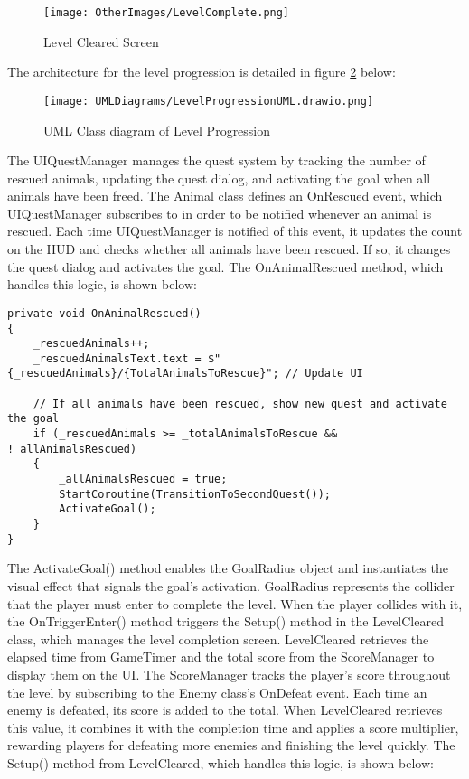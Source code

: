 \documentclass[]{final_report}
\begin{document}
\begin{figure}[H]
    \centering
    \texttt{[image: OtherImages/LevelComplete.png]}
    \caption{Level Cleared Screen}
    \label{fig:label_levelcleared}
\end{figure}

The architecture for the level progression is detailed in figure \ref{fig:label_levelprogression} below:

\begin{figure}[H]
    \centering
    \texttt{[image: UMLDiagrams/LevelProgressionUML.drawio.png]}
    \caption{UML Class diagram of Level Progression}
    \label{fig:label_levelprogression}
\end{figure}

The UIQuestManager manages the quest system by tracking the number of rescued animals, updating the quest dialog, and activating the goal when all animals have been freed. The Animal class defines an OnRescued event, which UIQuestManager subscribes to in order to be notified whenever an animal is rescued. Each time UIQuestManager is notified of this event, it updates the count on the HUD and checks whether all animals have been rescued. If so, it changes the quest dialog and activates the goal. The OnAnimalRescued method, which handles this logic, is shown below:
\begin{verbatim}
private void OnAnimalRescued()
{
    _rescuedAnimals++;
    _rescuedAnimalsText.text = $"{_rescuedAnimals}/{TotalAnimalsToRescue}"; // Update UI

    // If all animals have been rescued, show new quest and activate the goal
    if (_rescuedAnimals >= _totalAnimalsToRescue && !_allAnimalsRescued)
    {
        _allAnimalsRescued = true;
        StartCoroutine(TransitionToSecondQuest());
        ActivateGoal();
    }
}
\end{verbatim}
The ActivateGoal() method enables the GoalRadius object and instantiates the visual effect that signals the goal’s activation. GoalRadius represents the collider that the player must enter to complete the level. When the player collides with it, the OnTriggerEnter() method triggers the Setup() method in the LevelCleared class, which manages the level completion screen.
LevelCleared retrieves the elapsed time from GameTimer and the total score from the ScoreManager to display them on the UI. The ScoreManager tracks the player’s score throughout the level by subscribing to the Enemy class's OnDefeat event. Each time an enemy is defeated, its score is added to the total. When LevelCleared retrieves this value, it combines it with the completion time and applies a score multiplier, rewarding players for defeating more enemies and finishing the level quickly. The Setup() method from LevelCleared, which handles this logic, is shown below:
\end{document}
